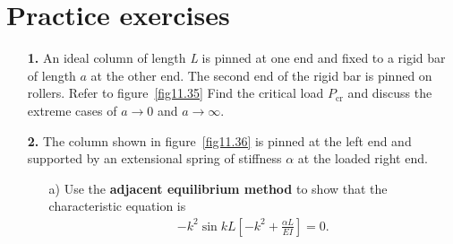 \documentclass{AeroStructure-ERJohnson}
\begin{document}
\section{Practice exercises}\label{sec11.11}

\begin{exercise}
\begin{enumerate}[\textbf{2.}]
\item[\textbf{1.}] An ideal column of length \textit{L} is pinned at one end and fixed to a rigid bar of length $a$ at the other end. The second end of the rigid bar is pinned on rollers. Refer to figure~\ref{fig11.35} Find the critical load $P_{\mathrm{cr}}$ and discuss the extreme cases of $a \rightarrow 0$ and $a \rightarrow \infty$.
\vspace*{8pt}
\pagebreak


\item[\textbf{2.}] The column shown in figure~\ref{fig11.36} is pinned at the left end and supported by an extensional spring of stiffness $\alpha$ at the loaded right end.

\vspace*{-5pt}


\begin{enumerate}[b)]
\item[{\hskip13pt}a)] Use the \textbf{adjacent equilibrium method} to show that the characteristic equation is
\begin{align*}
-k^{2} \sin k L\left[-k^{2}+\frac{\alpha L}{E I}\right]=0.
\end{align*}


\end{enumerate}
\end{enumerate}
\end{exercise}
\end{document}
